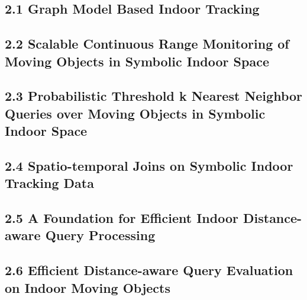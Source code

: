 \documentclass{beamer}
\begin{document}
\subsection{2.1 Graph Model Based Indoor Tracking} %

% 
% 

\subsection{2.2 Scalable Continuous Range Monitoring of Moving Objects in Symbolic Indoor Space} %

% 
% 

\subsection{2.3 Probabilistic Threshold k Nearest Neighbor Queries over Moving Objects in Symbolic Indoor Space} %

% 
% 

\subsection{2.4 Spatio-temporal Joins on Symbolic Indoor Tracking Data} %

% 
% 

\subsection{2.5 A Foundation for Efficient Indoor Distance-aware Query Processing} %

% 
% 

\subsection{2.6 Efficient Distance-aware Query Evaluation on Indoor Moving Objects} %
\end{document}
